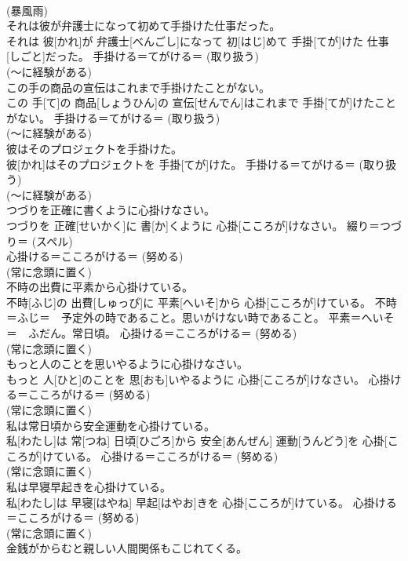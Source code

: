 \documentclass[8pt]{extreport}
\begin{document}
\begin{CJK}{UTF8}{min}
{\\	(暴風雨) 
\\	それは彼が弁護士になって初めて手掛けた仕事だった。	
\\	それは 彼[かれ]が 弁護士[べんごし]になって 初[はじ]めて 手掛[てが]けた 仕事[しごと]だった。	手掛ける＝てがける＝ (取り扱う) 
\\	(〜に経験がある) 
\\	この手の商品の宣伝はこれまで手掛けたことがない。	
\\	この 手[て]の 商品[しょうひん]の 宣伝[せんでん]はこれまで 手掛[てが]けたことがない。	手掛ける＝てがける＝ (取り扱う) 
\\	(〜に経験がある) 
\\	彼はそのプロジェクトを手掛けた。	
\\	彼[かれ]はそのプロジェクトを 手掛[てが]けた。	手掛ける＝てがける＝ (取り扱う) 
\\	(〜に経験がある) 
\\	つづりを正確に書くように心掛けなさい。	
\\	つづりを 正確[せいかく]に 書[か]くように 心掛[こころが]けなさい。	綴り＝つづり＝ (スペル) 
\\	心掛ける＝こころがける＝ (努める) 
\\	(常に念頭に置く) 
\\	不時の出費に平素から心掛けている。	
\\	不時[ふじ]の 出費[しゅっぴ]に 平素[へいそ]から 心掛[こころが]けている。	不時＝ふじ＝　予定外の時であること。思いがけない時であること。 平素＝へいそ＝　ふだん。常日頃。 心掛ける＝こころがける＝ (努める) 
\\	(常に念頭に置く) 
\\	もっと人のことを思いやるように心掛けなさい。	
\\	もっと 人[ひと]のことを 思[おも]いやるように 心掛[こころが]けなさい。	心掛ける＝こころがける＝ (努める) 
\\	(常に念頭に置く) 
\\	私は常日頃から安全運動を心掛けている。	
\\	私[わたし]は 常[つね] 日頃[ひごろ]から 安全[あんぜん] 運動[うんどう]を 心掛[こころが]けている。	心掛ける＝こころがける＝ (努める) 
\\	(常に念頭に置く) 
\\	私は早寝早起きを心掛けている。	
\\	私[わたし]は 早寝[はやね] 早起[はやお]きを 心掛[こころが]けている。	心掛ける＝こころがける＝ (努める) 
\\	(常に念頭に置く) 
\\	金銭がからむと親しい人間関係もこじれてくる。	
}
\end{CJK}
\end{document}
